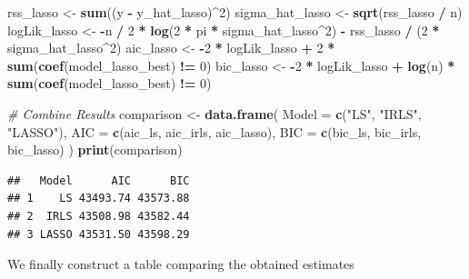 \documentclass[
]{article}
\newenvironment{Shaded}{\begin{snugshade}}{\end{snugshade}}
\newcommand{\AttributeTok}[1]{\textcolor[rgb]{0.13,0.29,0.53}{#1}}
\newcommand{\CommentTok}[1]{\textcolor[rgb]{0.56,0.35,0.01}{\textit{#1}}}
\newcommand{\DecValTok}[1]{\textcolor[rgb]{0.00,0.00,0.81}{#1}}
\newcommand{\FunctionTok}[1]{\textcolor[rgb]{0.13,0.29,0.53}{\textbf{#1}}}
\newcommand{\NormalTok}[1]{#1}
\newcommand{\OtherTok}[1]{\textcolor[rgb]{0.56,0.35,0.01}{#1}}
\newcommand{\SpecialCharTok}[1]{\textcolor[rgb]{0.81,0.36,0.00}{\textbf{#1}}}
\newcommand{\StringTok}[1]{\textcolor[rgb]{0.31,0.60,0.02}{#1}}
\begin{document}
\begin{Shaded}
\begin{Highlighting}[]
\NormalTok{rss\_lasso }\OtherTok{\textless{}{-}} \FunctionTok{sum}\NormalTok{((y }\SpecialCharTok{{-}}\NormalTok{ y\_hat\_lasso)}\SpecialCharTok{\^{}}\DecValTok{2}\NormalTok{)}
\NormalTok{sigma\_hat\_lasso }\OtherTok{\textless{}{-}} \FunctionTok{sqrt}\NormalTok{(rss\_lasso }\SpecialCharTok{/}\NormalTok{ n)}
\NormalTok{logLik\_lasso }\OtherTok{\textless{}{-}} \SpecialCharTok{{-}}\NormalTok{n }\SpecialCharTok{/} \DecValTok{2} \SpecialCharTok{*} \FunctionTok{log}\NormalTok{(}\DecValTok{2} \SpecialCharTok{*}\NormalTok{ pi }\SpecialCharTok{*}\NormalTok{ sigma\_hat\_lasso}\SpecialCharTok{\^{}}\DecValTok{2}\NormalTok{) }\SpecialCharTok{{-}}\NormalTok{ rss\_lasso }\SpecialCharTok{/}\NormalTok{ (}\DecValTok{2} \SpecialCharTok{*}\NormalTok{ sigma\_hat\_lasso}\SpecialCharTok{\^{}}\DecValTok{2}\NormalTok{)}
\NormalTok{aic\_lasso }\OtherTok{\textless{}{-}} \SpecialCharTok{{-}}\DecValTok{2} \SpecialCharTok{*}\NormalTok{ logLik\_lasso }\SpecialCharTok{+} \DecValTok{2} \SpecialCharTok{*} \FunctionTok{sum}\NormalTok{(}\FunctionTok{coef}\NormalTok{(model\_lasso\_best) }\SpecialCharTok{!=} \DecValTok{0}\NormalTok{)}
\NormalTok{bic\_lasso }\OtherTok{\textless{}{-}} \SpecialCharTok{{-}}\DecValTok{2} \SpecialCharTok{*}\NormalTok{ logLik\_lasso }\SpecialCharTok{+} \FunctionTok{log}\NormalTok{(n) }\SpecialCharTok{*} \FunctionTok{sum}\NormalTok{(}\FunctionTok{coef}\NormalTok{(model\_lasso\_best) }\SpecialCharTok{!=} \DecValTok{0}\NormalTok{)}

\CommentTok{\# Combine Results}
\NormalTok{comparison }\OtherTok{\textless{}{-}} \FunctionTok{data.frame}\NormalTok{(}
  \AttributeTok{Model =} \FunctionTok{c}\NormalTok{(}\StringTok{"LS"}\NormalTok{, }\StringTok{"IRLS"}\NormalTok{, }\StringTok{"LASSO"}\NormalTok{),}
  \AttributeTok{AIC =} \FunctionTok{c}\NormalTok{(aic\_ls, aic\_irls, aic\_lasso),}
  \AttributeTok{BIC =} \FunctionTok{c}\NormalTok{(bic\_ls, bic\_irls, bic\_lasso)}
\NormalTok{)}
\FunctionTok{print}\NormalTok{(comparison)}
\end{Highlighting}
\end{Shaded}

\begin{verbatim}
##   Model      AIC      BIC
## 1    LS 43493.74 43573.88
## 2  IRLS 43508.98 43582.44
## 3 LASSO 43531.50 43598.29
\end{verbatim}

We finally construct a table comparing the obtained estimates
\end{document}
